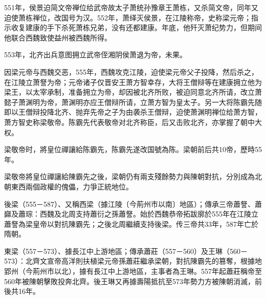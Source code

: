 551年，侯景迫简文帝禅位给武帝故太子萧统孙豫章王萧栋，又杀简文帝，同年又迫使萧栋禅位，改国号为汉。552年，萧绎灭侯景，在江陵称帝，史称梁元帝；指示收复建康的手下杀死萧栋兄弟，没有还都建康。年底，他歼灭萧纪势力，但期间他联合西魏致使益州被西魏所得。

553年，北齐出兵意图拥立武帝侄湘阴侯萧退为帝，未果。

因梁元帝与西魏交恶，555年，西魏攻克江陵，迫使梁元帝父子投降，然后杀之，在江陵立萧詧为帝；元帝诸子仅晋安王萧方智幸存，大将王僧辩等在建康拥立他为梁王，以太宰承制，准备拥立为帝，却因被北齐所败，被迫同意北齐所请，改立萧懿子萧渊明为帝，萧渊明亦应王僧辩所请，立萧方智为皇太子。另一大将陈霸先随即以王僧辩投降北齐、抛弃先帝之子为由袭杀王僧辩，迫使萧渊明禅位给萧方智，萧方智史称梁敬帝。陈霸先代表敬帝对北齐称臣，后又击败北齐，亦掌握了朝中大权。

梁敬帝时，將皇位禪讓給陈霸先，陈霸先遂改国號為陈。梁朝前后共10帝，歷時55年。

梁敬帝將皇位禪讓給陳霸先之後，梁朝仍有兩支殘餘勢力與陳朝對抗，分別成為北朝東西兩個政權的傀儡，力爭正統地位。

後梁（555－587）、又稱西梁（據江陵〔今荊州市以南〕地區）；傳承三帝蕭詧、蕭巋及蕭琮：西魏及北周支持蕭衍之孫蕭詧。始於西魏恭帝拓跋廓於555年在江陵立蕭詧為梁皇帝以對抗陳霸先；之後北周繼續支持後梁。传三帝共33年，587年亡於隋朝。

東梁（557－573）、據長江中上游地區；傳承蕭莊（557－560）及王琳（560－573）：北齊文宣帝高洋則扶植梁元帝孫蕭莊繼承梁朝，對抗陳霸先的篡奪，根據地郢州（今荊州市以北），據有長江中上游地區，主事者為王琳。557年起蕭莊稱帝至560年被陳朝擊敗投奔北齊。後王琳又再據壽陽抵抗至573年勢力方被陳朝消滅，前後共16年。










